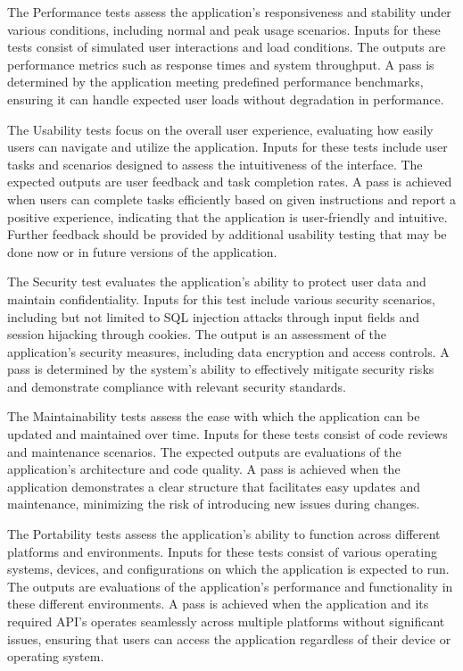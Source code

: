 \documentclass[12pt, titlepage]{article}
\begin{document}
The Performance tests assess the application's responsiveness and stability under 
various conditions, including normal and peak usage scenarios. Inputs for these tests 
consist of simulated user interactions and load conditions. The outputs are performance 
metrics such as response times and system throughput. A pass is determined by the 
application meeting predefined performance benchmarks, ensuring it can handle expected 
user loads without degradation in performance.

The Usability tests focus on the overall user experience, evaluating how easily users 
can navigate and utilize the application. Inputs for these tests include user tasks 
and scenarios designed to assess the intuitiveness of the interface. The expected 
outputs are user feedback and task completion rates. A pass is achieved when users 
can complete tasks efficiently based on given instructions and report a positive 
experience, indicating that the application is user-friendly and intuitive. Further 
feedback should be provided by additional usability testing that may be done now or in
future versions of the application.

The Security test evaluates the application's ability to protect user data and maintain 
confidentiality. Inputs for this test include various security scenarios, including but 
not limited to SQL injection attacks through input fields and session hijacking through cookies.
The output is an assessment of the application's 
security measures, including data encryption and access controls. A pass is determined 
by the system's ability to effectively mitigate security risks and demonstrate 
compliance with relevant security standards.

The Maintainability tests assess the ease with which the application can be updated 
and maintained over time. Inputs for these tests consist of code reviews and 
maintenance scenarios. The expected outputs are evaluations of the application's 
architecture and code quality. A pass is achieved when the application demonstrates 
a clear structure that facilitates easy updates and maintenance, minimizing the 
risk of introducing new issues during changes.

The Portability tests assess the application's ability to function across different 
platforms and environments. Inputs for these tests consist of various operating 
systems, devices, and configurations on which the application is expected to run. 
The outputs are evaluations of the application's performance and functionality in 
these different environments. A pass is achieved when the application and its required API's
operates seamlessly across multiple platforms without significant issues, ensuring that 
users can access the application regardless of their device or operating system.
\end{document}
